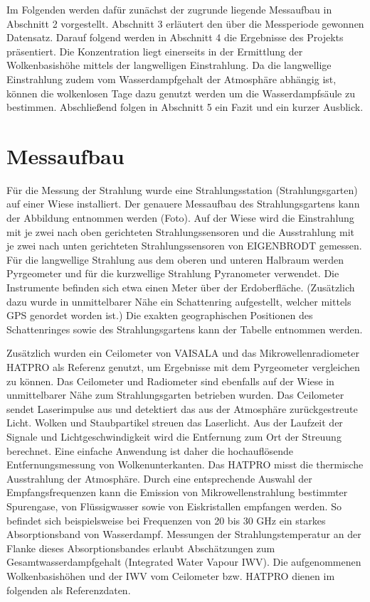\documentclass[10pt,a4paper,compsoc,peer review papers]{IEEEtran}
\begin{document}
Im Folgenden werden dafür zunächst der zugrunde liegende Messaufbau in
Abschnitt 2 vorgestellt. Abschnitt 3 erläutert den über die Messperiode
gewonnen Datensatz. Darauf folgend werden in Abschnitt 4 die Ergebnisse des
Projekts präsentiert.  Die Konzentration liegt einerseits in der Ermittlung der
Wolkenbasishöhe mittels der langwelligen Einstrahlung. Da die langwellige
Einstrahlung zudem vom Wasserdampfgehalt der Atmosphäre abhängig ist, können
die wolkenlosen Tage dazu genutzt werden um die Wasserdampfsäule zu bestimmen.
Abschließend folgen in Abschnitt 5 ein Fazit und ein kurzer Ausblick.

\section{Messaufbau}
Für die Messung der Strahlung wurde eine Strahlungsstation (Strahlungsgarten)
auf einer Wiese installiert. Der genauere Messaufbau des Strahlungsgartens kann
der Abbildung entnommen werden (Foto). Auf der Wiese wird die Einstrahlung mit
je zwei nach oben gerichteten Strahlungssensoren und die Ausstrahlung mit je
zwei nach unten gerichteten Strahlungssensoren von EIGENBRODT gemessen. Für die
langwellige Strahlung aus dem oberen und unteren Halbraum werden Pyrgeometer
und für die kurzwellige Strahlung Pyranometer verwendet. Die Instrumente
befinden sich etwa einen Meter über der Erdoberfläche. (Zusätzlich dazu wurde
in unmittelbarer Nähe ein Schattenring aufgestellt, welcher mittels GPS
genordet worden ist.) Die exakten geographischen Positionen des Schattenringes
sowie des Strahlungsgartens kann der Tabelle entnommen werden. 

Zusätzlich wurden ein Ceilometer von VAISALA und das Mikrowellenradiometer
HATPRO als Referenz genutzt, um Ergebnisse mit dem Pyrgeometer vergleichen zu
können. Das Ceilometer und Radiometer sind ebenfalls auf der Wiese in
unmittelbarer Nähe zum Strahlungsgarten betrieben wurden. Das Ceilometer sendet
Laserimpulse aus und detektiert das aus der Atmosphäre zurückgestreute Licht.
Wolken und Staubpartikel streuen das Laserlicht. Aus der Laufzeit der Signale
und Lichtgeschwindigkeit wird die Entfernung zum Ort der Streuung berechnet.
Eine einfache Anwendung ist daher die hochauflösende Entfernungsmessung von
Wolkenunterkanten. Das HATPRO misst die thermische Ausstrahlung der Atmosphäre.
Durch eine entsprechende Auswahl der Empfangsfrequenzen kann die Emission von
Mikrowellenstrahlung bestimmter Spurengase, von Flüssigwasser sowie von
Eiskristallen empfangen werden. So befindet sich beispielsweise bei Frequenzen
von 20 bis 30 GHz ein starkes Absorptionsband von Wasserdampf. Messungen der
Strahlungstemperatur an der Flanke dieses Absorptionsbandes erlaubt
Abschätzungen zum Gesamtwasserdampfgehalt (Integrated Water Vapour IWV). Die
aufgenommenen Wolkenbasishöhen und der IWV vom Ceilometer bzw. HATPRO dienen im
folgenden als Referenzdaten. 
\end{document}
